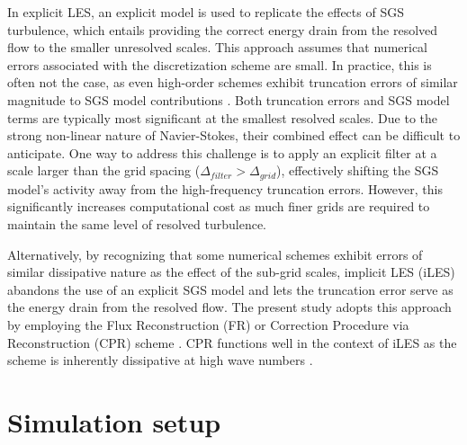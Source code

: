 \documentclass{article}
\begin{document}
In explicit LES, an explicit model is used to replicate the effects of SGS turbulence, which entails providing the correct energy drain from the resolved flow to the smaller unresolved scales. This approach assumes that numerical errors associated with the discretization scheme are small. In practice, this is often not the case, as even high-order schemes exhibit truncation errors of similar magnitude to SGS model contributions \citep{GHOSAL1996187}. Both truncation errors and SGS model terms are typically most significant at the smallest resolved scales. Due to the strong non-linear nature of Navier-Stokes, their combined effect can be difficult to anticipate. One way to address this challenge is to apply an explicit filter at a scale larger than the grid spacing ($\Delta_{filter} > \Delta_{grid}$), effectively shifting the SGS model's activity away from the high-frequency truncation errors. However, this significantly increases computational cost as much finer grids are required to maintain the same level of resolved turbulence. 

Alternatively, by recognizing that some numerical schemes exhibit errors of similar dissipative nature as the effect of the sub-grid scales, implicit LES (iLES) abandons the use of an explicit SGS model and lets the truncation error serve as the energy drain from the resolved flow. The present study adopts this approach by employing the Flux Reconstruction (FR) or Correction Procedure via Reconstruction (CPR) scheme \citep{Huynh2007}. CPR functions well in the context of iLES as the scheme is inherently dissipative at high wave numbers \citep{VINCENT20118134}.


\section{Simulation setup} \label{sec:appsimset}
\end{document}
